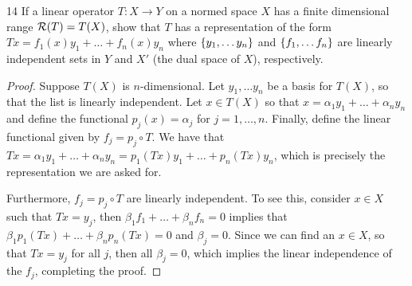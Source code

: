 \begin{exercise}{14}
If a linear operator $T: X \to Y$ on a normed space $X$ has a finite dimensional range $\mathcal{R}(T) = T(X)$, show that $T$ has a representation of the form $Tx = f_1(x) y_1 + \dots + f_n(x) y_n$ where $\{y_1, \dots y_n\}$ and $\{f_1, \dots f_n\}$ are linearly independent sets in $Y$ and $X'$ (the dual space of $X$), respectively.
\end{exercise}
\begin{proof}
Suppose $T(X)$ is $n$-dimensional.
Let $y_1, \dots y_n$ be a basis for $T(X)$, so that the list is linearly independent.
Let $x \in T(X)$ so that $x = \alpha_1 y_1 + \dots + \alpha_n y_n$ and define the functional $p_j(x) = \alpha_j$ for $j =1, \dots, n$.
Finally, define the linear functional given by $f_j = p_j \circ T$.
We have that $Tx = \alpha_1 y_1 + \dots + \alpha_n y_n = p_1(Tx) y_1 + \dots + p_n(Tx) y_n$, which is precisely the representation we are asked for.

Furthermore, $f_j = p_j \circ T$ are linearly independent.
To see this, consider $x \in X$ such that $Tx = y_j$, then $\beta_1 f_1 + \dots + \beta_n f_n = 0$ implies that $\beta_1 p_1 (Tx) + \dots + \beta_n p_n (Tx) = 0$ and $\beta_j = 0$.
Since we can find an $x \in X$, so that $Tx = y_j$ for all $j$, then all $\beta_j = 0$, which implies the linear independence of the $f_j$, completing the proof.
\end{proof} 
